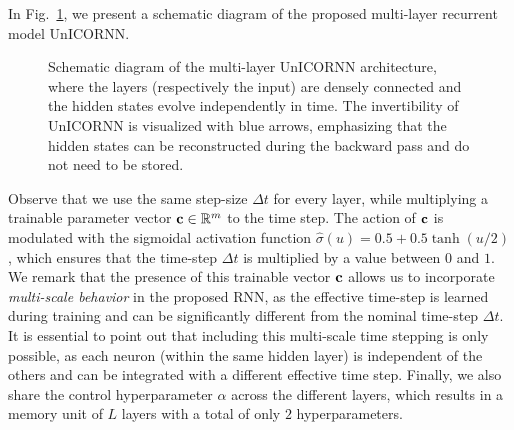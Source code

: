 \documentclass{article}
\newcommand{\by}{{\bf y}}
\newcommand{\bz}{{\bf z}}
\newcommand{\bu}{{\bf u}}
\newcommand{\bc}{{\bf c}}
\newcommand{\Dt}{{\Delta t}}
\newcommand{\fref}[1] {Fig.~\ref{#1}}
\begin{document}
In \fref{fig:diagram}, we present a schematic diagram of the proposed multi-layer recurrent model UnICORNN.
\begin{figure}[ht]
\vskip 0.2in
\begin{center}
\begin{minipage}{.35\textwidth}
\end{minipage}
\caption{Schematic diagram of the multi-layer UnICORNN architecture, where the layers (respectively the input) are densely connected and the hidden states evolve independently in time. The invertibility of UnICORNN is visualized with blue arrows, emphasizing that the hidden states can be reconstructed during the backward pass and do not need to be stored.}
\label{fig:diagram}
\end{center}
\vskip -0.2in
\end{figure}

Observe that we use the same step-size $\Dt$ for every layer, while multiplying a trainable parameter vector $\bc \in \mathbb{R}^m$ to the time step. The action of $\bc$ is modulated with the sigmoidal activation function $\hat{\sigma}(u)= 0.5 + 0.5\tanh(u/2)$, which ensures that the time-step $\Dt$ is multiplied by a value between $0$ and $1$. We remark that the presence of this trainable vector $\bc$ allows us to incorporate \emph{multi-scale behavior} in the proposed RNN, as the effective time-step is learned during training and can be significantly different from the nominal time-step $\Dt$. It is essential to point out that including this multi-scale time stepping is only possible, as each neuron (within the same hidden layer) is independent of the others and can be integrated with a different effective time step. Finally, we also share the control hyperparameter $\alpha$ across the different layers, which results in a memory unit of $L$ layers with a total of only $2$ hyperparameters. 
\end{document}
